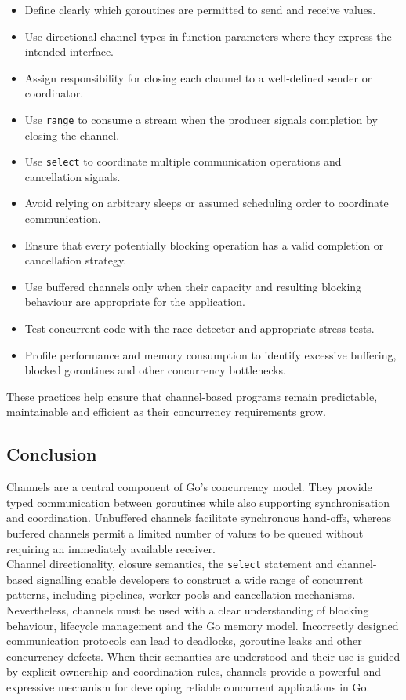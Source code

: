 \begin{itemize}
    \item Define clearly which goroutines are permitted to send and receive values.
    \item Use directional channel types in function parameters where they express the intended interface.
    \item Assign responsibility for closing each channel to a well-defined sender or coordinator.
    \item Use \texttt{range} to consume a stream when the producer signals completion by closing the channel.
    \item Use \texttt{select} to coordinate multiple communication operations and cancellation signals.
    \item Avoid relying on arbitrary sleeps or assumed scheduling order to coordinate communication.
    \item Ensure that every potentially blocking operation has a valid completion or cancellation strategy.
    \item Use buffered channels only when their capacity and resulting blocking behaviour are appropriate for the application.
    \item Test concurrent code with the race detector and appropriate stress tests.
    \item Profile performance and memory consumption to identify excessive buffering, blocked goroutines and other concurrency bottlenecks.
\end{itemize}

These practices help ensure that channel-based programs remain predictable, maintainable and efficient as their concurrency requirements grow.

\subsection{Conclusion}

Channels are a central component of Go's concurrency model. They provide typed communication between goroutines while also supporting synchronisation and coordination. Unbuffered channels facilitate synchronous hand-offs, whereas buffered channels permit a limited number of values to be queued without requiring an immediately available receiver.\\

Channel directionality, closure semantics, the \texttt{select} statement and channel-based signalling enable developers to construct a wide range of concurrent patterns, including pipelines, worker pools and cancellation mechanisms.\\

Nevertheless, channels must be used with a clear understanding of blocking behaviour, lifecycle management and the Go memory model. Incorrectly designed communication protocols can lead to deadlocks, goroutine leaks and other concurrency defects. When their semantics are understood and their use is guided by explicit ownership and coordination rules, channels provide a powerful and expressive mechanism for developing reliable concurrent applications in Go.
